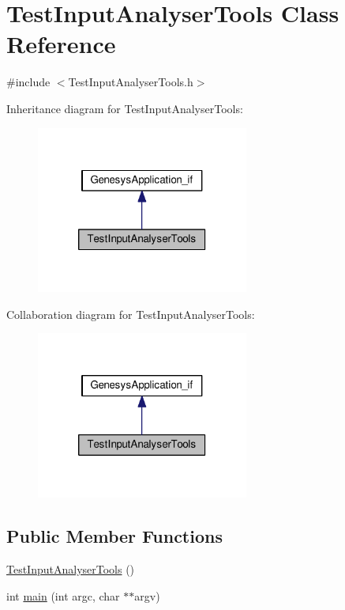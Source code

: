 \hypertarget{class_test_input_analyser_tools}{\section{Test\-Input\-Analyser\-Tools Class Reference}
\label{class_test_input_analyser_tools}
}


{\ttfamily \#include $<$Test\-Input\-Analyser\-Tools.\-h$>$}



Inheritance diagram for Test\-Input\-Analyser\-Tools\-:\nopagebreak
\begin{figure}[H]
\begin{center}
\leavevmode
\includegraphics[width=198pt]{class_test_input_analyser_tools__inherit__graph}
\end{center}
\end{figure}


Collaboration diagram for Test\-Input\-Analyser\-Tools\-:\nopagebreak
\begin{figure}[H]
\begin{center}
\leavevmode
\includegraphics[width=198pt]{class_test_input_analyser_tools__coll__graph}
\end{center}
\end{figure}
\subsection*{Public Member Functions}
\begin{DoxyCompactItemize}
\item 
\hyperlink{class_test_input_analyser_tools_a2ff911cb851cf82142f65d60a0eeea4e}{Test\-Input\-Analyser\-Tools} ()
\item 
int \hyperlink{class_test_input_analyser_tools_a8015a3024f29bddc865cb0b419214cd7}{main} (int argc, char $\ast$$\ast$argv)
\end{DoxyCompactItemize}


